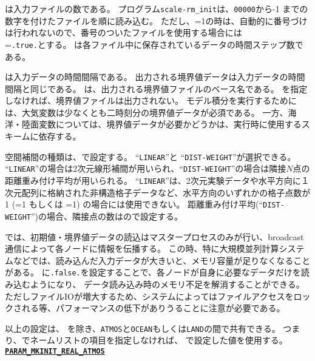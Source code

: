 は入力ファイルの数である。
プログラム\verb|scale-rm_init|は、\verb|00000|から-1 までの数字を付けたファイルを順に読み込む。
ただし、=1の時は、自動的に番号づけは行われないので、番号のついたファイルを使用する場合には\\
=\verb|.true.|とする。
は各ファイル中に保存されているデータの時間ステップ数である。

は入力データの時間間隔である。
出力される境界値データは入力データの時間間隔と同じである。
は、出力される境界値ファイルのベース名である。
を指定しなければ、境界値ファイルは出力されない。
モデル積分を実行するためには、大気変数は少なくとも二時刻分の境界値データが必須である。
一方、海洋・陸面変数については、境界値データが必要かどうかは、実行時に使用するスキームに依存する。

空間補間の種類は、で設定する。
``\verb|LINEAR|''と ``\verb|DIST-WEIGHT|''が選択できる。
``\verb|LINEAR|''の場合は2次元線形補間が用いられ、``\verb|DIST-WEIGHT|''の場合は隣接$N$点の距離重み付け平均が用いられる。
``\verb|LINEAR|''は、2次元実験データや水平方向に１次元配列に格納された非構造格子データなど、水平方向のいずれかの格子点数が1 (=1 もしくは =1) の場合には使用できない。
距離重み付け平均(``\verb|DIST-WEIGHT|'')の場合、隣接点の数はので設定する。


\scalerm では、初期値・境界値データの読込はマスタープロセスのみが行い、broadcast通信によって各ノードに情報を伝播する。
この時、特に大規模並列計算システムなどでは、読み込んだ入力データが大きいと、メモリ容量が足りなくなることがある。
に\verb|.false.|を設定することで、各ノードが自身に必要なデータだけを読み込むようになり、
データ読み込み時のメモリ不足を解消することができる。
ただしファイルIOが増大するため、システムによってはファイルアクセスをロックされる等、パフォーマンスの低下がありうることに注意が必要である。


以上の設定は、 を除き、\verb|ATMOS|と\verb|OCEAN|もしくは\verb|LAND|の間で共有できる。
つまり、でネームリストの項目を指定しなければ、
で設定した値を使用する。
\\

\noindent\textbf{\underline{\texttt{PARAM\_MKINIT\_REAL\_ATMOS}}}

